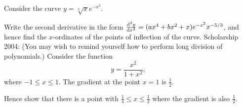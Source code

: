 \begin{questions}
            Consider the curve $ y = \sqrt[3]{x} e^{-x^2} $.

            Write the second derivative in the form $ \od[2]{y}{x} = (ax^4 + bx^2 + x)e^{-x^2} x^{-5/3} $, and hence
            find the $ x$-ordinates of the points of inflection of the curve.
  \questioS Scholarship 2004: (You may wish to remind yourself how to perform long division of polynomials.) Consider the function
            \begin{displaymath}
              y = \frac{x^2}{1 + x^2},
            \end{displaymath}
            where $ -1 \leq x \leq 1 $. The gradient at the point $ x = 1 $ is $ \frac{1}{2} $.

            Hence show that there is a point with $ \frac{1}{4} \leq x \leq \frac{1}{2} $ where the gradient is also $ \frac{1}{2} $.
\end{questions}

